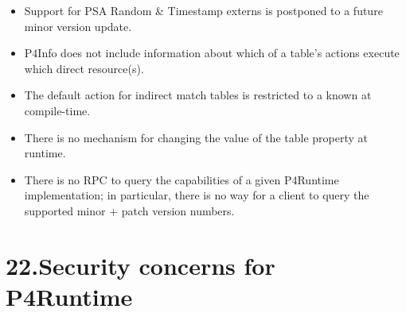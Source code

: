 \documentclass[11pt]{article}
\begin{document}
{\begin{itemize}
\begin{itemize}[noitemsep,topsep=\mdcompacttopsep]
\item{}a  or  with an underlying type that is one of the above (or
in general a \textquotedblleft{}chain\textquotedblright{} of  and/or  that eventually ends with
one of the types above)%
\end{itemize}%

\item{}
Support for PSA Random \& Timestamp externs is postponed to a future minor
version update.%

\item{}
P4Info does not include information about which of a table's actions execute
which direct resource(s).%

\item{}
The default action for indirect match tables is restricted to a  known at compile-time.%

\item{}
There is no mechanism for changing the value of the 
table property at runtime.%

\item{}
There is no RPC to query the capabilities of a given P4Runtime implementation;
in particular, there is no way for a client to query the supported minor +
patch version numbers.%
\end{itemize}%

\section{22.\hspace*{0.5em}Security concerns for P4Runtime}\label{sec-security-concerns-for-p4runtime}%

}
\end{document}
